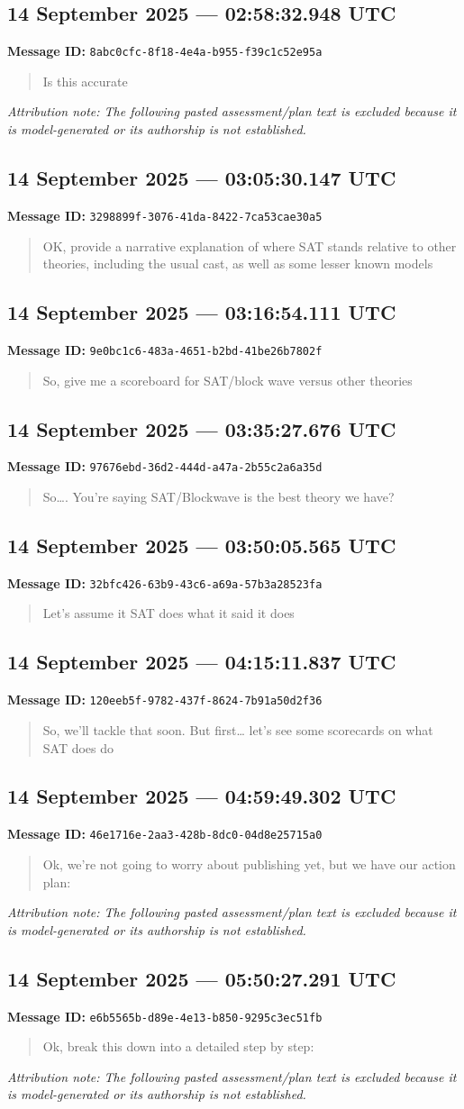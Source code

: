 \documentclass[11pt,letterpaper]{article}
\newcommand{\messageentry}[3]{%
  \Needspace{7\baselineskip}
  \subsection*{#1}
  {\small\textbf{Message ID:} \texttt{#2}}
  \vspace{2pt}
}
\begin{document}
\messageentry{14 September 2025 --- 02:58:32.948 UTC}{8abc0cfc-8f18-4e4a-b955-f39c1c52e95a}{}
\begin{quote}\small
Is this accurate 
\end{quote}
{\small\emph{Attribution note: The following pasted assessment/plan text is excluded because it is model-generated or its authorship is not established.}}

\messageentry{14 September 2025 --- 03:05:30.147 UTC}{3298899f-3076-41da-8422-7ca53cae30a5}{}
\begin{quote}\small
OK, provide a narrative explanation of where SAT stands relative to other theories, including the usual cast, as well as some lesser known models
\end{quote}

\messageentry{14 September 2025 --- 03:16:54.111 UTC}{9e0bc1c6-483a-4651-b2bd-41be26b7802f}{}
\begin{quote}\small
So, give me a scoreboard for SAT/block wave versus other theories
\end{quote}

\messageentry{14 September 2025 --- 03:35:27.676 UTC}{97676ebd-36d2-444d-a47a-2b55c2a6a35d}{}
\begin{quote}\small
So…. You’re saying SAT/Blockwave is the best theory we have?
\end{quote}

\messageentry{14 September 2025 --- 03:50:05.565 UTC}{32bfc426-63b9-43c6-a69a-57b3a28523fa}{}
\begin{quote}\small
Let’s assume it SAT does what it said it does
\end{quote}

\messageentry{14 September 2025 --- 04:15:11.837 UTC}{120eeb5f-9782-437f-8624-7b91a50d2f36}{}
\begin{quote}\small
So, we’ll tackle that soon. But first… let’s see some scorecards on what SAT does do
\end{quote}

\messageentry{14 September 2025 --- 04:59:49.302 UTC}{46e1716e-2aa3-428b-8dc0-04d8e25715a0}{}
\begin{quote}\small
Ok, we’re not going to worry about publishing yet, but we have our action plan:
\end{quote}
{\small\emph{Attribution note: The following pasted assessment/plan text is excluded because it is model-generated or its authorship is not established.}}

\messageentry{14 September 2025 --- 05:50:27.291 UTC}{e6b5565b-d89e-4e13-b850-9295c3ec51fb}{}
\begin{quote}\small
Ok, break this down into a detailed step by step:
\end{quote}
{\small\emph{Attribution note: The following pasted assessment/plan text is excluded because it is model-generated or its authorship is not established.}}
\end{document}
